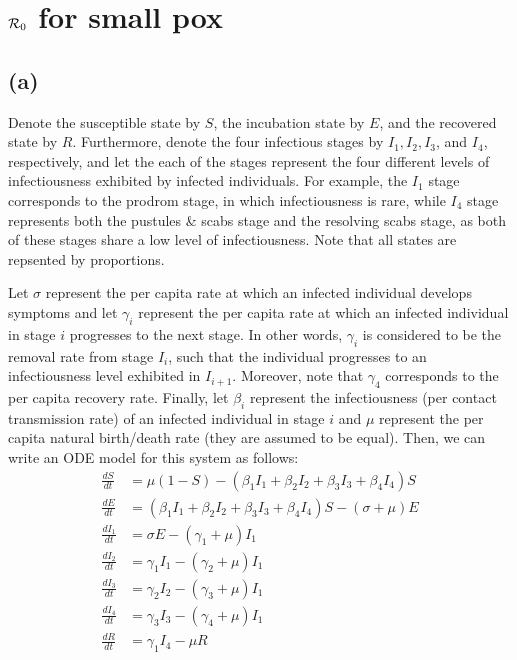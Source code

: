 \documentclass{article}
\begin{document}
\section{${\cal R}_0$ for small pox}

\subsection*{(a)}

Denote the susceptible state by $S$, the incubation state by $E$, and the recovered state by $R$. Furthermore, denote the four infectious stages by $I_1, I_2, I_3$, and $I_4$, respectively, and let the each of the stages represent the four different levels of infectiousness exhibited by infected individuals. For example, the $I_1$ stage corresponds to the prodrom stage, in which infectiousness is rare, while $I_4$ stage represents both the pustules \& scabs stage and the resolving scabs stage, as both of these stages share a low level of infectiousness. Note that all states are repsented by proportions.

Let $\sigma$ represent the per capita rate at which an infected individual develops symptoms and let $\gamma_i$ represent the per capita rate at which an infected individual in stage $i$ progresses to the next stage. In other words, $\gamma_i$ is considered to be the removal rate from stage $I_i$, such that the individual progresses to an infectiousness level exhibited in $I_{i+1}$. Moreover, note that $\gamma_4$ corresponds to the per capita recovery rate. 
Finally, let $\beta_i$ represent the infectiousness (per contact transmission rate) of an infected individual in stage $i$ and $\mu$ represent the per capita natural birth/death rate (they are assumed to be equal). Then, we can write an ODE model for this system as follows:
$$
\begin{aligned}
\frac{dS}{dt} &= \mu (1-S) - (\beta_1 I_1 + \beta_2 I_2 + \beta_3 I_3 + \beta_4 I_4) S\\
\frac{dE}{dt} &= (\beta_1 I_1 + \beta_2 I_2 + \beta_3 I_3 + \beta_4 I_4) S - (\sigma + \mu) E \\
\frac{dI_1}{dt} &= \sigma E - (\gamma_1 + \mu) I_1\\
\frac{dI_2}{dt} &= \gamma_1 I_1 - (\gamma_2 + \mu) I_1\\
\frac{dI_3}{dt} &= \gamma_2 I_2 - (\gamma_3 + \mu) I_1\\
\frac{dI_4}{dt} &= \gamma_3 I_3 - (\gamma_4 + \mu) I_1\\
\frac{dR}{dt} &= \gamma_1 I_4 - \mu R\\
\end{aligned}
$$
\end{document}
